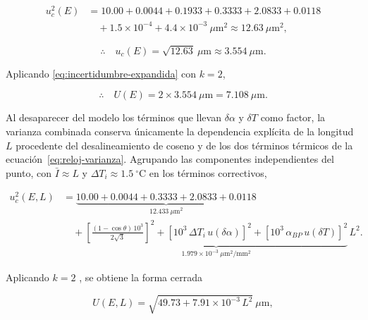 \begin{equation}
  \begin{aligned}
    u_c^2(E) &= 10.00 + 0.0044 + 0.1933 + 0.3333 + 2.0833 + 0.0118 \\
    &\quad + 1.5\times10^{-4} + 4.4\times10^{-3}\ \mu\text{m}^2
    \approx 12.63\ \mu\text{m}^2,
  \end{aligned}
  \label{eq:reloj-varianza-num}
\end{equation}

\begin{equation}
  \therefore\quad u_c(E) = \sqrt{12.63}\ \mu\text{m}
  \approx 3.554\ \mu\text{m}.
  \label{eq:reloj-sigma-c-num-valor}
\end{equation}

Aplicando \eqref{eq:incertidumbre-expandida} con $k = 2$,

\begin{equation}
  \therefore\quad U(E) = 2 \times 3.554\ \mu\text{m} = 7.108\ \mu\text{m}.
  \label{eq:reloj-U-num-valor}
\end{equation}

Al desaparecer del modelo los términos que llevan $\delta\alpha$ y $\delta T$ como
factor, la varianza combinada conserva únicamente la dependencia explícita de la
longitud $L$ procedente del desalineamiento de coseno y de los dos términos térmicos de
la ecuación~\eqref{eq:reloj-varianza}. Agrupando las componentes independientes del
punto, con $\bar I \approx L$ y $\Delta T_i \approx 1.5\ ^\circ\text{C}$ en los
términos correctivos,

\begin{equation}
  \begin{aligned}
    u_c^2(E,L) &=
    \underbrace{10.00 + 0.0044 + 0.3333 + 2.0833 + 0.0118}_{12.433\ \mu\text{m}^2}
    \\[4pt]
    &\quad + \underbrace{\left[\frac{(1-\cos\theta)\,10^3}{2\sqrt{3}}\right]^2
      + \left[10^3\,\Delta T_i\,u(\delta\alpha)\right]^2
      + \left[10^3\,\alpha_{BP}\,u(\delta T)\right]^2}
      _{1.979\times10^{-3}\ \mu\text{m}^2/\text{mm}^2}\,L^2 .
  \end{aligned}
  \label{eq:reloj-sigma-c-L}
\end{equation}

Aplicando $k = 2$ \parencite{jcgm2008gum, inacal_pc014}, se obtiene la forma cerrada

\begin{equation}
  U(E,L) = \sqrt{49.73 + 7.91\times10^{-3}\,L^2}\ \mu\text{m},
  \label{eq:reloj-U-vecL}
\end{equation}

